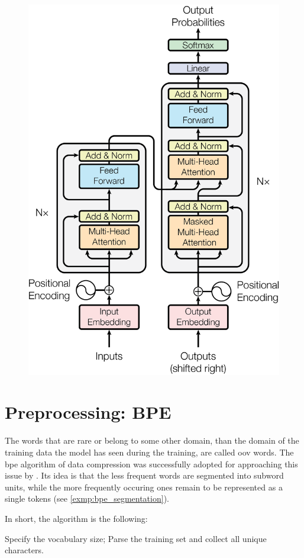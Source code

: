 \begin{figure}[h]
	\centering
	\includegraphics[width=0.5\columnwidth]{img/transformer_architecture.png}
	 {}
	\label{fig:transformer_architecture}
\end{figure}


\section{{Preprocessing: BPE}}
\label{section:bpe}

The words that are rare or belong to some other domain, than the domain
of the training data the model has seen during the training, are called
\acrshort{oov} words.
The \acrfull{bpe} algorithm  of data compression
was successfully adopted for approaching this issue by .
Its idea is that the less frequent words are segmented into subword units,
while the more frequently occuring ones remain to be represented as a single
tokens (see \cref{exmp:bpe_segmentation}).

In short, the algorithm is the following:
\begin{outline}
	\1 Specify the vocabulary size;
	\1 Parse the training set and collect all unique characters.

\end{outline}

